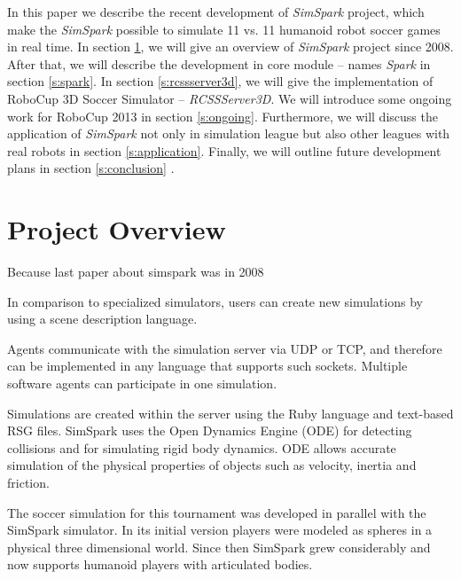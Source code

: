 \documentclass{llncs}
\begin{document}
In this paper we describe the recent development of \textit{SimSpark} project, which make the \textit{SimSpark} possible to simulate 11 vs. 11 humanoid robot soccer games in real time.
In section \ref{s:overview}, we will give an overview of \textit{SimSpark} project since 2008. After that, we will describe the development in core module -- names \textit{Spark} in section \ref{s:spark}. In section \ref{s:rcssserver3d}, we will give the implementation of RoboCup 3D Soccer Simulator -- \textit{RCSSServer3D}. We will introduce some ongoing work for RoboCup 2013 in 
section \ref{s:ongoing}. Furthermore, we will discuss the application of \textit{SimSpark} not only in simulation league but also other leagues with real robots in section \ref{s:application}. Finally, we will outline future development plans in section \ref{s:conclusion} .



\section{Project Overview}
\label{s:overview}
Because last paper about simspark was in 2008

In comparison to specialized simulators, users can create new simulations by using a scene description language.

Agents communicate with the simulation server via UDP or TCP, and therefore can be implemented in any language that supports such sockets.
Multiple software agents can participate in one simulation.

Simulations are created within the server using the Ruby language and text-based RSG files.
SimSpark uses the Open Dynamics Engine (ODE) for detecting collisions and for simulating rigid body dynamics. ODE allows accurate simulation of the physical properties of objects such as velocity, inertia and friction.

The soccer simulation for this tournament was developed in parallel with the SimSpark simulator. In its initial version players were modeled as spheres in a physical three dimensional world. Since then SimSpark grew considerably and now supports humanoid players with articulated bodies.
\end{document}
